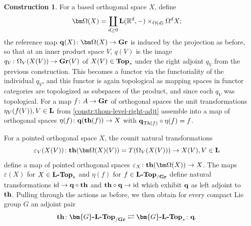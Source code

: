 \documentclass[reqno]{memo-l}
\theoremstyle{mythm}
\theoremstyle{definition}
\newtheorem{constr}[thm]{Construction}
\numberwithin{equation}{section}
\newcommand{\R} {{\mathbb{R}}}
\renewcommand{\epsilon}{\varepsilon}
\newcommand{\cat}[1]{\textbf{\textup{#1}}}
\renewcommand{\O}{{\textup{O}}}
\newcommand{\id}{\textup{id}}
\newcommand{\Gospc}[1]{\cat{$\bm{#1}$-$\cat{L}$-Top}}
\newcommand{\Th}{{\textup{Th}}}
\newcommand{\Gr}{\cat{Gr}}
\begin{document}
\begin{constr} 
  For a based orthogonal space $X$, define 
  \[ \bm\Omega(X)= \coprod_{d\geq 0}\cat L(\R^d,-)\times_{\O(d)}\Omega^dX ;\]
  the reference map $\cat{q}(X)\colon\bm\Omega(X)\to\cat{Gr}$ is induced by the {projection} as before, so that at an inner product space $V$, $q(V)$ is the image $q_V\colon\Omega_V(X(V))\to\Gr(V)$ of $X(V)\in \cat{Top}_*$ under the right adjoint $q_V$ from the previous construction. This becomes a functor via the functoriality of the individual $q_V$, and this functor is again topological as mapping spaces in functor categories are topologized as subspaces of the product, and since each $q_V$ was topological. For a map $f\colon A\to \Gr$ of orthogonal spaces the unit transformations $\eta_V(f(V)), V\in\cat L$ from \ref{constr:thom-level-right-adjt} assemble into a map of orthogonal spaces $\eta(f)\colon \cat{q}(\cat{th}(f))\to X$ with $\cat{q}_{\Th(f)}\circ \eta(f)=f$. 

  For a pointed orthogonal space $X$, the counit natural transformations \[\epsilon_V(X(V))\colon \cat{th}(\bm\Omega(X)(V))=T(\Omega_V(X(V)))\to X(V), V\in\cat L\] define a map of pointed orthogonal spaces $\epsilon_X\colon \cat{th}(\bm\Omega(X))\to X$.
  The maps $\epsilon(X)$ for $X\in \cat{L-Top}_*$ and $\eta(f)$ for ${f\in \cat{L-Top}_{/\Gr}}$ define natural transformations $\id\to \textbf{q}\circ \cat{th}$ and $\cat{th}\circ \cat{q}\to\id$ which exhibit $\cat{q}$ as left adjoint to $\cat{th}$. Pulling through the actions as before, we then obtain for every compact Lie group $G$ an adjoint pair
  \[\cat{th}\colon  \Gospc{G}_{/\Gr}\rightleftarrows \Gospc{G}_*\colon \textbf{q}.\]
\end{constr}
\end{document}
